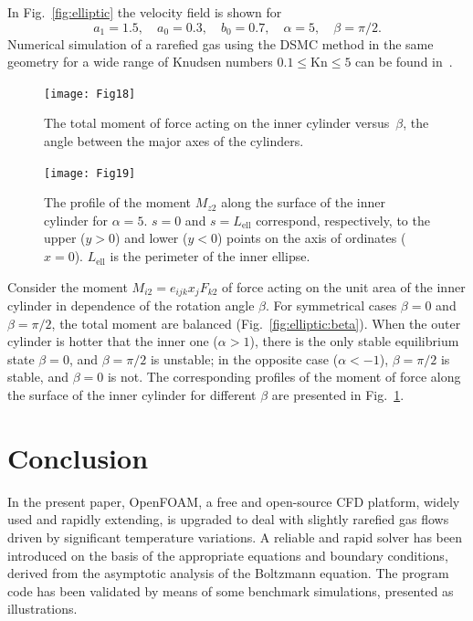 \documentclass[smallextended, referee]{svjour3} %
\newcommand{\Kn}{\mathrm{Kn}}
\begin{document}
In Fig.~\ref{fig:elliptic} the velocity field is shown for
\[ a_1 = 1.5, \quad a_0 = 0.3, \quad b_0 = 0.7, \quad \alpha = 5, \quad \beta = \pi/2. \]
Numerical simulation of a rarefied gas using the DSMC method in the same geometry
for a wide range of Knudsen numbers \(0.1\le\Kn\le5\) can be found in~\cite{SoneCoaxial}.

\begin{figure}[ht]
    \centering
    \begin{minipage}{.48\textwidth}
        \centering
        \texttt{[image: Fig18]}
        \caption{The total moment of force acting on the inner cylinder
        	versus~\(\beta\), the angle between the major axes of the cylinders.}
        \label{fig:elliptic:beta}
    \end{minipage}
    \quad
    \begin{minipage}{.48\textwidth}
        \centering
        \texttt{[image: Fig19]}
        \caption{The profile of the moment \(M_{z2}\) along the surface of
        	the inner cylinder for \(\alpha=5\).
        	\(s=0\) and \(s=L_\mathrm{ell}\) correspond, respectively,
        	to the upper (\(y>0\)) and lower (\(y<0\)) points on the axis of ordinates (\(x=0\)).
        	\(L_\mathrm{ell}\) is the perimeter of the inner ellipse.}
        \label{fig:elliptic:profiles}
    \end{minipage}
\end{figure}

Consider the moment \(M_{i2} = e_{ijk}x_jF_{k2}\) of force acting on the unit area of the inner cylinder
in dependence of the rotation angle \(\beta\). For symmetrical cases \(\beta=0\) and \(\beta=\pi/2\),
the total moment are balanced (Fig.~\ref{fig:elliptic:beta}).
When the outer cylinder is hotter that the inner one (\(\alpha > 1\)),
there is the only stable equilibrium state \(\beta=0\), and \(\beta=\pi/2\) is unstable;
in the opposite case (\(\alpha < -1\)), \(\beta=\pi/2\) is stable, and \(\beta=0\) is not.
The corresponding profiles of the moment of force along the surface of the inner cylinder
for different \(\beta\) are presented in Fig.~\ref{fig:elliptic:profiles}.

\section{Conclusion}

In the present paper, OpenFOAM\textregistered{}, a free and open-source CFD platform,
widely used and rapidly extending, is upgraded to deal with
slightly rarefied gas flows driven by significant temperature variations.
A reliable and rapid solver has been introduced on the basis of the appropriate
equations and boundary conditions, derived from the asymptotic analysis of the Boltzmann equation.
The program code has been validated by means of some benchmark simulations,
presented as illustrations.
\end{document}
